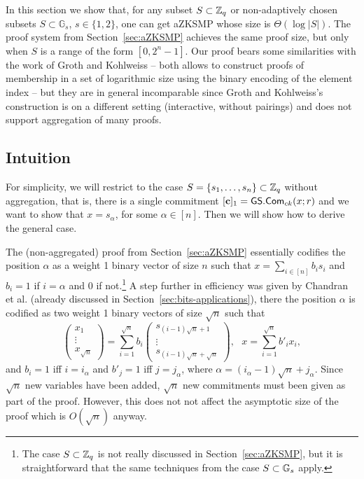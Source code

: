 In this section we show that, for any subset $S\subset\mathbb{Z}_q$ or non-adaptively chosen subsets $S\subset\mathbb{G}_s$, $s\in\{1,2\}$, one can get aZKSMP whose size is $\Theta(\log|S|)$. The proof system from Section~\ref{sec:aZKSMP} achieves the same proof size, but only when $S$ is a range of the form $[0,2^n-1]$. Our proof bears some similarities with the work of Groth and Kohlweiss \cite{EC:GroKoh15} -- both allows to construct proofs of membership in a set of logarithmic size using the binary encoding of the element index -- but they are in general incomparable since Groth and Kohlweiss's construction is on a different setting (interactive, without pairings) and does not support aggregation of many proofs.

\subsection{Intuition}

For simplicity, we will restrict to the case $S=\{s_1,\ldots,s_n\}\subset\mathbb{Z}_q$ without aggregation, that is, there is a single commitment $[\mathbf{c}]_1={\mathsf{GS}}.\mathsf{Com}_{ck}(x;r)$ and we want to show that $x=s_\alpha$, for some $\alpha\in[n]$. Then we will show how to derive the general case.

The (non-aggregated) proof from Section~\ref{sec:aZKSMP} essentially codifies the position $\alpha$ as a weight 1 binary vector of size $n$ such that $x=\sum_{i\in[n]}b_is_i$ and
$b_i=1$ if $i=\alpha$ and $0$ if not.\footnote{The case $S\subset\mathbb{Z}_q$ is not really discussed in Section~\ref{sec:aZKSMP}, but it is straightforward that the same techniques from the case $S\subset\mathbb{G}_s$ apply.} A step further in efficiency was given by Chandran et al. \cite{ICALP:ChaGroSah07} (already discussed in Section~\ref{sec:bits-applications}), there the position $\alpha$ is codified as two weight 1 binary vectors of size $\sqrt{n}$ such that
$$
\begin{pmatrix}
x_1\\\vdots\\x_{\sqrt{n}}
\end{pmatrix}
=\sum_{i=1}^{\sqrt{n}}b_i
\begin{pmatrix}
s_{(i-1)\sqrt{n}+1}\\\vdots\\s_{(i-1)\sqrt{n}+\sqrt{n}}
\end{pmatrix},
\text{ } x=\sum_{i=1}^{\sqrt{n}}b'_ix_i,$$
and $b_i=1$ iff $i=i_\alpha$ and $b'_j=1$ iff $j=j_\alpha$, where $\alpha=(i_\alpha-1)\sqrt{n}+j_\alpha$. Since $\sqrt{n}$ new variables have been added, $\sqrt{n}$ new commitments must been given as part of the proof. However, this does not not affect the asymptotic size of the proof which is $O(\sqrt{n})$ anyway.

